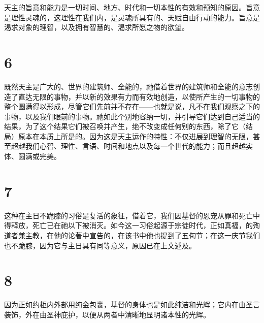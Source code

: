 天主的旨意和能力是一切时间、地方、时代和一切本性的有效和预知的原因。旨意是理性灵魂的，这理性在我们内，是灵魂所具有的、天赋自由行动的能力。旨意是渴求对象的理智，以及拥有智慧的、渴求所愿之物的欲望。\par


\section{6}

既然天主是广大的、世界的建筑师、全能的，祂借着世界的建筑师和全能的意志创造了直达无限的事物，并以新的效果有力而有效地创造，以使所产生的一切事物的整个圆满得以形成，尽管它们先前并不存在——也就是说，凡不在我们观察之下的事物，以及我们眼前的事物。祂如此个别地容纳一切，并引导它们达到自己适当的结果，为了这个结果它们被召唤并产生，绝不改变成任何别的东西，除了它（结局）原本在本质上所是的。因为这是天主运作的特性：不仅进展到理智的无限，甚至超越我们心智、理性、言语、时间和地点以及每一个世代的能力；而且超越实体、圆满或完美。\par


\section{7}

这种在主日不跪膝的习俗是复活的象征，借着它，我们因基督的恩宠从罪和死亡中得释放，死亡已在祂以下被消灭。如今这一习俗起源于宗徒时代，正如真福，的殉道者兼主教，在他的论著中宣告的，在该书中他也提到了五旬节；在这一庆节我们也不跪膝，因为它与主日具有同等意义，原因已在上文述及。\par


\section{8}

因为正如约柜内外部用纯金包裹，基督的身体也是如此纯洁和光辉；它内在由圣言装饰，外在由圣神庇护，以便从两者中清晰地显明诸本性的光辉。\par


